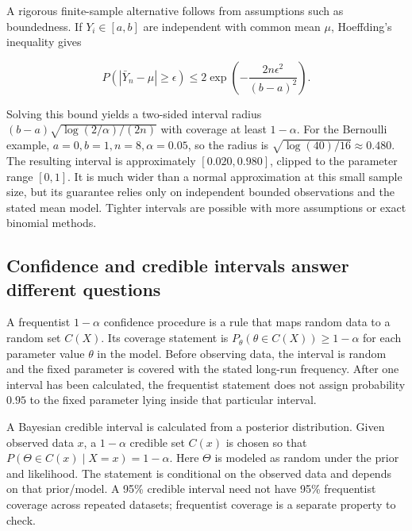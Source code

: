 A rigorous finite-sample alternative follows from assumptions such as boundedness. If \(Y_i\in[a,b]\) are independent with common mean \(\mu\), Hoeffding's inequality gives

\[
P(|\bar Y_n-\mu|\ge\epsilon)\le2\exp\left(-\frac{2n\epsilon^2}{(b-a)^2}\right).
\]

Solving this bound yields a two-sided interval radius \((b-a)\sqrt{\log(2/\alpha)/(2n)}\) with coverage at least \(1-\alpha\). For the Bernoulli example, \(a=0,b=1,n=8,\alpha=0.05\), so the radius is \(\sqrt{\log(40)/16}\approx0.480\). The resulting interval is approximately \([0.020,0.980]\), clipped to the parameter range \([0,1]\). It is much wider than a normal approximation at this small sample size, but its guarantee relies only on independent bounded observations and the stated mean model. Tighter intervals are possible with more assumptions or exact binomial methods.

\subsection{Confidence and credible intervals answer different questions}\label{03-visual-computing-i-ch012-confidence-and-credible-intervals-answer-different-questions}

\hypertarget{03-visual-computing-i-ch012-confidence-and-credible-intervals-answer-different-questions}{}

A frequentist \(1-\alpha\) confidence procedure is a rule that maps random data to a random set \(C(X)\). Its coverage statement is \(P_\theta(\theta\in C(X))\ge1-\alpha\) for each parameter value \(\theta\) in the model. Before observing data, the interval is random and the fixed parameter is covered with the stated long-run frequency. After one interval has been calculated, the frequentist statement does not assign probability \(0.95\) to the fixed parameter lying inside that particular interval.

A Bayesian credible interval is calculated from a posterior distribution. Given observed data \(x\), a \(1-\alpha\) credible set \(C(x)\) is chosen so that \(P(\Theta\in C(x)\mid X=x)=1-\alpha\). Here \(\Theta\) is modeled as random under the prior and likelihood. The statement is conditional on the observed data and depends on that prior/model. A 95\% credible interval need not have 95\% frequentist coverage across repeated datasets; frequentist coverage is a separate property to check.

